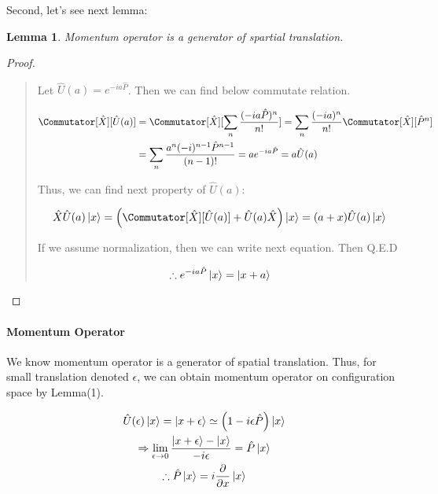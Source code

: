 \documentclass[final]{IEEEphot}
\newtheorem{lemma}{Lemma}[section]
\newcommand{\PD}[2]{\dfrac{\partial #1}{\partial #2}} %
\newcommand{\eps}{\epsilon}
\newcommand{\hX}{\hat{X}}
\newcommand{\hP}{\hat{P}}
\newcommand{\hU}{\hat{U}}
\newcommand{\BKS}[1]{\left( #1 \right)} %
\newcommand{\VS}{\vspace{0.3cm}} %
\begin{document}
Second, let's see next lemma:

\VS

\begin{lemma}
 Momentum operator is a generator of spartial translation.
\end{lemma}

\begin{proof}
\begin{quote}
  Let $\hU(a) = e^{-ia\hP}$. Then we can find below commutate relation.
  
  \begin{equation}
   \begin{split}
    \Commutator[\hX][\hU(a)] &= \Commutator[\hX][\sum_n \frac{(-ia\hP)^n}{n!}] = \sum_n \frac{(-ia)^n}{n!}\Commutator[\hX][\hP^n] \\
                             &= \sum_n \frac{a^n (-i)^{n-1}\hP^{n-1}}{(n-1)!} = a e^{-ia\hP} = a\hU(a)
   \end{split}
  \end{equation}
  
  Thus, we can find next property of $\hU(a)$:
  
  \begin{equation}
   \hX \hU(a) \ket{x} = \BKS{\Commutator[\hX][\hU(a)] + \hU(a) \hX }\ket{x} = (a + x) \hU(a)\ket{x}
  \end{equation}

  If we assume normalization, then we can write next equation. Then Q.E.D
  
  \begin{equation}
   \therefore e^{-ia\hP} \ket{x} = \ket{x+a}
  \end{equation}

\end{quote}
\end{proof}

\newpage

\paragraph{Momentum Operator}

\VS

We know momentum operator is a generator of spatial translation. Thus, for small translation denoted $\eps$, we can obtain momentum operator on configuration space
by Lemma(1).

\begin{gather}
\nonumber
 \hU(\eps)\ket{x} = \ket{x+\eps} \simeq \BKS{1-i\eps\hP}\ket{x} \\ 
 \Rightarrow \lim_{\eps \rightarrow 0} \frac{\ket{x+\eps} - \ket{x}  }{-i\eps } = \hP \ket{x} \\
 \nonumber
 \therefore \hP\ket{x} = i\PD{}{x} \ket{x}
\end{gather}
\end{document}
